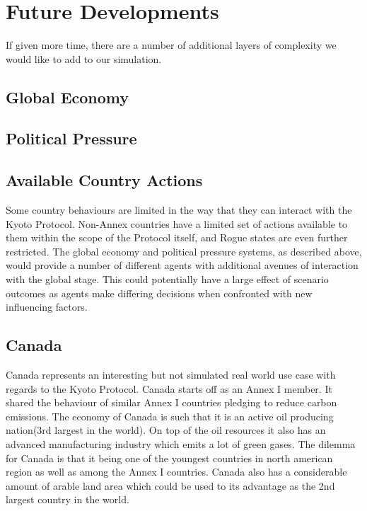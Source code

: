 \section{Future Developments}

If given more time, there are a number of additional layers of complexity we would like to add to our simulation. 

\subsection{Global Economy}



\subsection{Political Pressure}



\subsection{Available Country Actions}

Some country behaviours are limited in the way that they can interact with the Kyoto Protocol. Non-Annex countries have a limited set of actions available to them within the scope of the Protocol itself, and Rogue states are even further restricted. The global economy and political pressure systems, as described above, would provide a number of different agents with additional avenues of interaction with the global stage. This could potentially have a large effect of scenario outcomes as agents make differing decisions when confronted with new influencing factors.

\subsection{Canada}
Canada represents an interesting but not simulated real world use case with regards to the Kyoto Protocol. Canada starts off as an Annex I member. It shared the behaviour of similar Annex I countries pledging to reduce carbon emissions. The economy of Canada is such that it is an active oil producing nation(3rd largest in the world). On top of the oil resources it also has an advanced manufacturing industry which emits a lot of green gases. The dilemma for Canada is that it being one of the youngest countries in north american region as well as among the Annex I countries. Canada also has a considerable amount of arable land area which could be used to its advantage as the 2nd largest country in the world.

